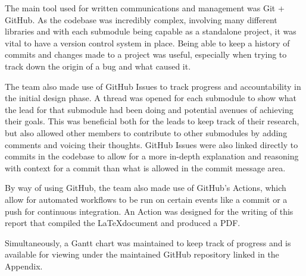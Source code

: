 \documentclass[a4paper]{article}
\begin{document}
The main tool used for written communications and management was Git + GitHub.
As the codebase was incredibly complex, 
involving many different libraries and with each submodule being capable as a
standalone project, it was vital to have a version control system in place. 
Being able to keep a history of commits and changes made to a project was useful,
especially when trying to track down the origin of a bug and what caused it. 

The team also made use of GitHub Issues to track progress and accountability in 
the initial design phase. A thread was opened for each submodule to show what 
the lead for that submodule had been doing and potential avenues of achieving 
their goals. This was beneficial both for the leads to keep track of their 
research, but also allowed other members to contribute to other submodules 
by adding comments and voicing their thoughts. GitHub Issues were also linked 
directly to commits in the codebase to allow for a more in-depth explanation and
reasoning with context for a commit than what is allowed in the commit message 
area. 

By way of using GitHub, the team also made use of GitHub's Actions, which allow 
for automated workflows to be run on certain events like a commit or a push for 
continuous integration. An Action was designed for the writing of this report
that compiled the \LaTeX document and produced a PDF. 

Simultaneously, a Gantt chart was maintained to keep track of progress and is 
available for viewing under the maintained GitHub repository linked in the Appendix.

\end{document}
